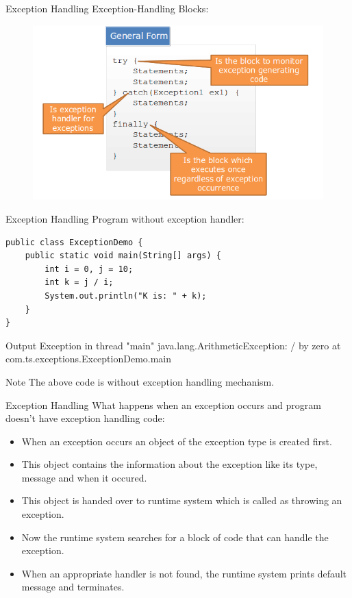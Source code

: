 \documentclass[14pt]{beamer}
\begin{document}
\begin{frame}{Exception Handling}
 Exception-Handling Blocks:
 \begin{figure}[H]
  \begin{center}
   \includegraphics[scale=.4]{general-form.png}
  \end{center}

 \end{figure}
\end{frame}

\begin{frame}[fragile]{Exception Handling}
 Program without exception handler:
 \begin{lstlisting}[basicstyle=\tiny]
public class ExceptionDemo {
    public static void main(String[] args) {
        int i = 0, j = 10;
        int k = j / i;
        System.out.println("K is: " + k);
    }
}
\end{lstlisting}
\begin{block}{Output}
Exception in thread "main" java.lang.ArithmeticException: / by zero
at com.ts.exceptions.ExceptionDemo.main
\end{block}
\begin{block}{Note}
 The above code is without exception handling mechanism.
\end{block}
\end{frame}

\begin{frame}{Exception Handling}
 What happens when an exception occurs and program doesn't have exception handling code:
 \begin{itemize}
  \item When an exception occurs an object of the exception type is created first.
  \item This object contains the information about the exception like its type, message and when it occured.
  \item This object is handed over to runtime system which is called as throwing an exception.
  \item Now the runtime system searches for a block of code that can handle the exception.
  \item When an appropriate handler is not found, the runtime system prints default message and terminates.
 \end{itemize}
\end{frame}
\end{document}
